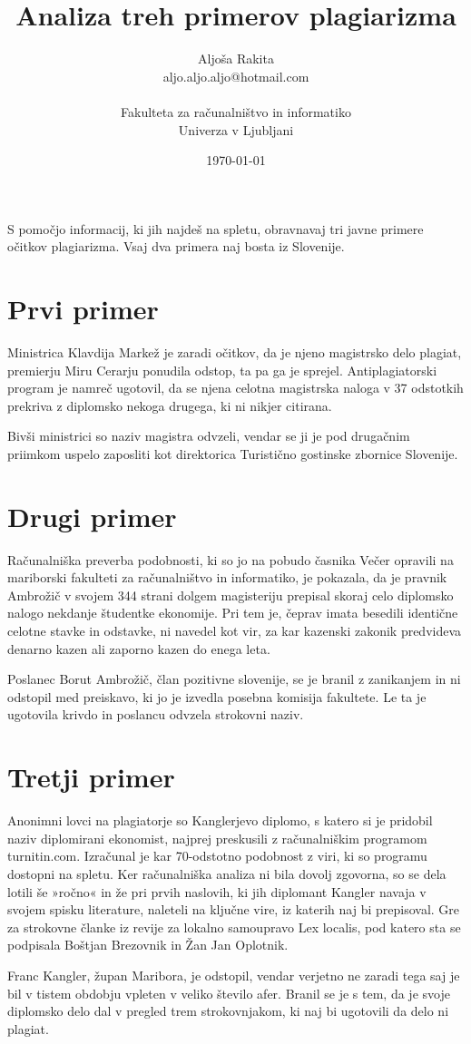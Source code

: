 \documentclass[11pt,a4paper]{article}
\title{Analiza treh primerov plagiarizma}
\author{Aljoša Rakita\\
aljo.aljo.aljo@hotmail.com\\
\ \\
Fakulteta za računalništvo in informatiko\\
Univerza v Ljubljani
\date{\today}         
}
\begin{document}
\maketitle

S pomočjo informacij, ki jih najdeš na spletu, obravnavaj tri javne primere očitkov plagiarizma. Vsaj dva primera naj bosta iz Slovenije.

\section{Prvi primer}

Ministrica Klavdija Markež je zaradi očitkov, da je njeno magistrsko delo plagiat, premierju Miru Cerarju ponudila odstop, ta pa ga je sprejel. Antiplagiatorski program je namreč ugotovil, da se njena celotna magistrska naloga v 37 odstotkih prekriva z diplomsko nekoga drugega, ki ni nikjer citirana. \cite{markez}

Bivši ministrici so naziv magistra odvzeli, vendar se ji je pod drugačnim priimkom uspelo zaposliti kot direktorica Turistično gostinske zbornice Slovenije.


\section{Drugi primer}

 Računalniška preverba podobnosti, ki so jo na pobudo časnika Večer opravili na mariborski fakulteti za računalništvo in informatiko, je pokazala, da je pravnik Ambrožič v svojem 344 strani dolgem magisteriju prepisal skoraj celo diplomsko nalogo nekdanje študentke ekonomije. Pri tem je, čeprav imata besedili identične celotne stavke in odstavke, ni navedel kot vir, za kar kazenski zakonik predvideva denarno kazen ali zaporno kazen do enega leta.\cite{ambrozic}

Poslanec Borut Ambrožič, član pozitivne slovenije, se je branil z zanikanjem in ni odstopil med preiskavo, ki jo je izvedla posebna komisija fakultete. Le ta je ugotovila krivdo in poslancu odvzela strokovni naziv.

\section{Tretji primer}

Anonimni lovci na plagiatorje so Kanglerjevo diplomo, s katero si je pridobil naziv diplomirani ekonomist, najprej preskusili z računalniškim programom turnitin.com. Izračunal je kar 70-odstotno podobnost z viri, ki so programu dostopni na spletu.
Ker računalniška analiza ni bila dovolj zgovorna, so se dela lotili še »ročno« in že pri prvih naslovih, ki jih diplomant Kangler navaja v svojem spisku literature, naleteli na ključne vire, iz katerih naj bi prepisoval. Gre za strokovne članke iz revije za lokalno samoupravo Lex localis, pod katero sta se podpisala Boštjan Brezovnik in Žan Jan Oplotnik. \cite{kangler}

Franc Kangler, župan Maribora, je odstopil, vendar verjetno ne zaradi tega saj je bil v tistem obdobju vpleten v veliko število afer. Branil se je s tem, da je svoje diplomsko delo dal v pregled trem strokovnjakom, ki naj bi ugotovili da delo ni plagiat.



\end{document}
